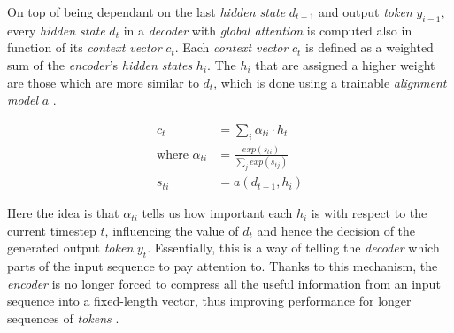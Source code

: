 On top of being dependant on the last \textit{hidden state} $d_{t-1}$ and output \textit{token} $y_{i-1}$, every \textit{hidden state} $d_t$ in a \textit{decoder} with \textit{global attention} is computed also in function of its \textit{context vector} $c_t$. Each \textit{context vector} $c_t$ is defined as a weighted sum of the \textit{encoder}'s \textit{hidden states} $h_i$. The $h_i$ that are assigned a higher weight are those which are more similar to $d_t$, which is done using a trainable \textit{alignment model} $a$ \cite{bahdanau_neural_2016}.

\begin{equation}
\begin{aligned}
c_t &= \sum_{i} \alpha_{ti} \cdot h_t \\
\mbox{where } \alpha_{ti} &= \frac{exp(s_{ti})}{\sum_{j} exp(s_{tj})} \\
s_{ti} &= a(d_{t-1},h_i)
\end{aligned}
\end{equation}

Here the idea is that $\alpha_{ti}$ tells us how important each $h_i$ is with respect to the current timestep $t$, influencing the value of $d_t$ and hence the decision of the generated output \textit{token} $y_t$. Essentially, this is a way of telling the \textit{decoder} which parts of the input sequence to pay attention to. Thanks to this mechanism, the \textit{encoder} is no longer forced to compress all the useful information from an input sequence into a fixed-length vector, thus improving performance for longer sequences of \textit{tokens} \cite{bahdanau_neural_2016}.
